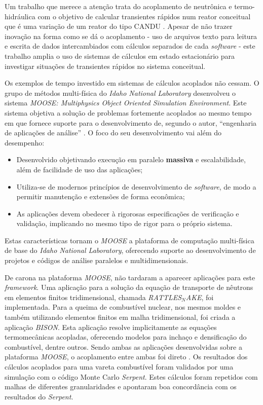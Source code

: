 Um trabalho que merece a atenção trata do acoplamento de neutrônica e termo-hidráulica com o objetivo
de calcular transientes rápidos num reator conceitual que é uma variação de um reator do tipo CANDU
\cite{Hummel2016}. Apesar de não trazer inovação na forma como se dá o acoplamento - uso de arquivos
texto para leitura e escrita de dados intercambiados com cálculos separados de cada \textit{software} -
este trabalho amplia o uso de sistemas de cálculos em estado estacionário para investigar situações
de transientes rápidos no sistema conceitual.



Os exemplos de tempo investido em sistemas de cálculos acoplados não cessam. O grupo
de métodos multi-física do \textit{Idaho National Laboratory} desenvolveu o sistema
\textit{MOOSE: Multiphysics Object Oriented Simulation Environment}. Este sistema objetiva
a solução de problemas fortemente acoplados ao mesmo tempo em que fornece suporte para
o desenvolvimento de, segundo o autor, ``engenharia de aplicações de análise''
\cite{Gaston2009}. O foco do seu desenvolvimento vai além do desempenho:
\begin{itemize}
\item Desenvolvido objetivando execução em paralelo \textbf{massiva} e escalabilidade,
  além de facilidade de uso das aplicações;
\item Utiliza-se de modernos princípios de desenvolvimento de \textit{software}, de modo
  a permitir manutenção e extensões de forma econômica;
\item As aplicações devem obedecer à rigorosas especificações de verificação e validação,
  implicando no mesmo tipo de rigor para o próprio sistema.
\end{itemize}
Estas características tornam o \textit{MOOSE} a plataforma de computação multi-física
de base do \textit{Idaho National Laboratory}, oferecendo suporte ao desenvolvimento
de projetos e códigos de análise paralelos e multidimensionais.

De carona na plataforma \textit{MOOSE}, não tardaram a aparecer aplicações para
este \textit{framework}. Uma aplicação para a solução da equação de transporte
de nêutrons em elementos finitos tridimensional, chamada \textit{RATTLES$_{N}$AKE},
foi implementada. Para a queima de combustível nuclear, nos mesmos moldes e
também utilizando elementos finitos em malha tridimensional, foi criada a aplicação
\textit{BISON}. Esta aplicação resolve implicitamente as equações termomecânicas
acopladas, oferecendo modelos para inchaço e densificação do combustível, dentre outros.
Sendo ambas as aplicações desenvolvidas sobre a plataforma \textit{MOOSE}, o acoplamento
entre ambas foi direto \cite{Gleicher2014}.
Os resultados dos cálculos acoplados para uma vareta combustível foram validados por uma simulação com o código Monte Carlo \textit{Serpent}.
Estes cálculos foram repetidos com malhas de diferentes granularidades e apontaram boa
concordância com os resultados do \textit{Serpent}.

